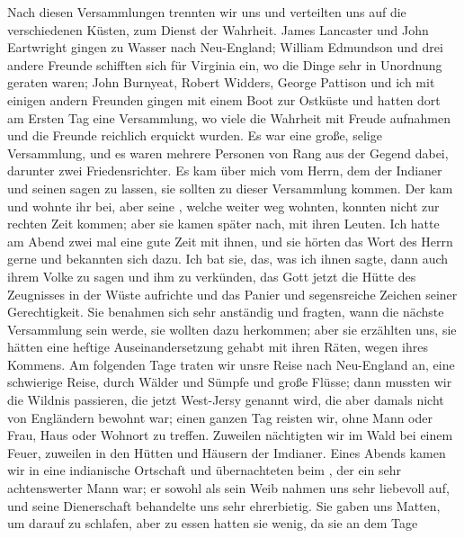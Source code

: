 Nach diesen Versammlungen trennten wir uns und verteilten
uns auf die verschiedenen Küsten, zum Dienst der Wahrheit.
James Lancaster und 
John Eartwright gingen zu Wasser nach
Neu-England; William Edmundson
und drei andere Freunde schifften sich für Virginia ein, 
wo die Dinge sehr in Unordnung geraten waren; John Burnyeat, 
Robert Widders, George 
Pattison
und ich mit einigen andern Freunden gingen mit einem Boot
zur Ostküste und hatten dort am Ersten Tag eine 
Versammlung, wo viele die Wahrheit mit Freude aufnahmen und die
Freunde reichlich erquickt wurden. Es war eine große, selige
Versammlung, und es waren mehrere Personen von Rang aus der 
Gegend dabei, darunter zwei Friedensrichter. Es kam über
mich vom Herrn, dem  der Indianer und seinen 
sagen zu lassen, sie sollten zu dieser Versammlung kommen. Der
 kam und wohnte ihr bei, aber seine , welche weiter
weg wohnten, konnten nicht zur rechten Zeit kommen; aber sie
kamen später nach, mit ihren Leuten. Ich hatte am Abend zwei
mal eine gute Zeit mit ihnen, und sie hörten das Wort des Herrn
gerne und bekannten sich dazu. Ich bat sie, das, was ich ihnen
sagte, dann auch ihrem Volke zu sagen und ihm zu verkünden,
das Gott jetzt die Hütte des Zeugnisses in der Wüste aufrichte
und das Panier und segensreiche Zeichen seiner Gerechtigkeit. Sie
benahmen sich sehr anständig und fragten, wann die nächste 
Versammlung sein werde, sie wollten dazu herkommen; aber sie
erzählten uns, sie hätten eine heftige Auseinandersetzung gehabt
mit ihren Räten, wegen ihres Kommens. Am folgenden Tage
traten wir unsre Reise nach Neu-England an, eine schwierige
Reise, durch Wälder und Sümpfe und große Flüsse; dann mussten
wir die Wildnis passieren, die jetzt West-Jersy genannt wird,
die aber damals nicht von Engländern bewohnt war; einen ganzen
Tag reisten wir, ohne Mann oder Frau, Haus oder Wohnort
zu treffen. Zuweilen nächtigten wir im Wald bei einem Feuer,
zuweilen in den Hütten und Häusern der Imdianer. Eines Abends
kamen wir in eine indianische Ortschaft und übernachteten beim
, der ein sehr achtenswerter Mann war; er sowohl als sein
Weib nahmen uns sehr liebevoll auf, und seine Dienerschaft 
behandelte uns sehr ehrerbietig. Sie gaben uns Matten, um darauf
zu schlafen, aber zu essen hatten sie wenig, da sie an dem Tage
